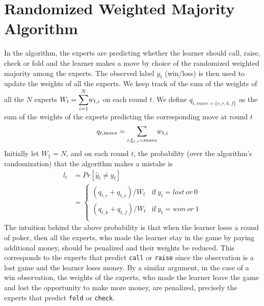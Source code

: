 \documentclass[12pt]{article}
\begin{document}
\section{Randomized Weighted Majority Algorithm}
\label{sec:rwma}
\noindent In the algorithm, the experts are predicting whether the learner should call, raise, check
or fold and the learner makes a move by choice of the randomized weighted majority
among the experts. The observed label $y_t$ (win/loss) is then used to update
the weights of all the experts. We keep track of the sum of the weights of all the $N$ experts $W_t =
\Sum_{i=1}^Nw_{t,i}$ on each round $t$. We define $q_{t,move=\{c,r,k,f\}}$ as the sum of the weights
of the experts predicting the corresponding move at round $t$ \ie \[q_{t,move}=\Sum_{i:\xi_{t,i}=move}w_{t,i}\]
Initially let $W_1 = N$,
and on each round $t$, the probability (over the algorithm's randomization) that the algorithm makes a mistake is
\begin{align}
l_t &= Pr[\hat{y}_t\neq y_t]\tag*{}\\
&=\begin{cases}
  	(q_{t,c} + q_{t, r})/W_t & \text{if}~y_{t}=lost~or~0\\
  	(q_{t,k} + q_{t, f})/W_t & \text{if}~y_{t}=won~or~1\\
	\end{cases}
\label{eq:prob-mistake}
\end{align}
\noindent The intuition behind the above probability is that when the learner loses
a round of poker, then all the experts, who made the learner stay in the game by paying
additional money, should be penalized and their weights be reduced. This corresponds to
the experts that predict \texttt{call} or \texttt{raise} since the observation is a lost
game and the learner loses money. By a similar argument, in the case of a win observation,
the weights of the experts, who made the learner leave the game and lost the opportunity
to make more money, are penalized, precisely the experts that predict \texttt{fold} or
\texttt{check}.\\
\end{document}
